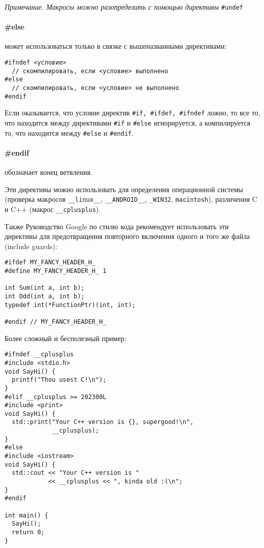 {\small \textit{Примечание. Макросы можно разопределить с помощью директивы} \verb|#undef| }

\paragraph{\#else} может использоваться только в связке с вышеназванными директивами:
\begin{verbatim}
#ifndef <условие>
  // скомпилировать, если <условие> выполнено
#else
  // скомпилировать, если <условие> не выполнено
#endif
\end{verbatim}

Если оказывается, что условие директив \verb|#if, #ifdef, #ifndef| ложно, то все то, что находится между директивами \verb|#if|
и \verb|#else| игнорируется, а компилируется то, что находится между \verb|#else| и \verb|#endif|.

\paragraph{\#endif} обозначает конец ветвления.

Эти директивы можно использовать для определения операционной системы (проверка макросов \verb|__linux__|, \verb|__ANDROID__|,
\verb|_WIN32|, \verb|macintosh|),
различения C и C++ (макрос \verb|__cplusplus|).

Также Руководство Google по стилю кода рекомендует использовать эти директивы для предотвращения повторного включения одного
и того же файла (include guards):
\begin{verbatim}
#ifdef MY_FANCY_HEADER_H_
#define MY_FANCY_HEADER_H_ 1

int Sum(int a, int b);
int Odd(int a, int b);
typedef int(*FunctionPtr)(int, int);

#endif // MY_FANCY_HEADER_H_
\end{verbatim}

Более сложный и бесполезный пример:
\begin{verbatim}
#ifndef __cplusplus
#include <stdio.h>
void SayHi() {
  printf("Thou usest C!\n");
}
#elif __cplusplus >= 202300L
#include <print>
void SayHi() {
  std::print("Your C++ version is {}, supergood!\n",
             __cplusplus);
}
#else
#include <iostream>
void SayHi() {
  std::cout << "Your C++ version is "
            << __cplusplus << ", kinda old :(\n";
}
#endif

int main() {
  SayHi();
  return 0;
}
\end{verbatim}

